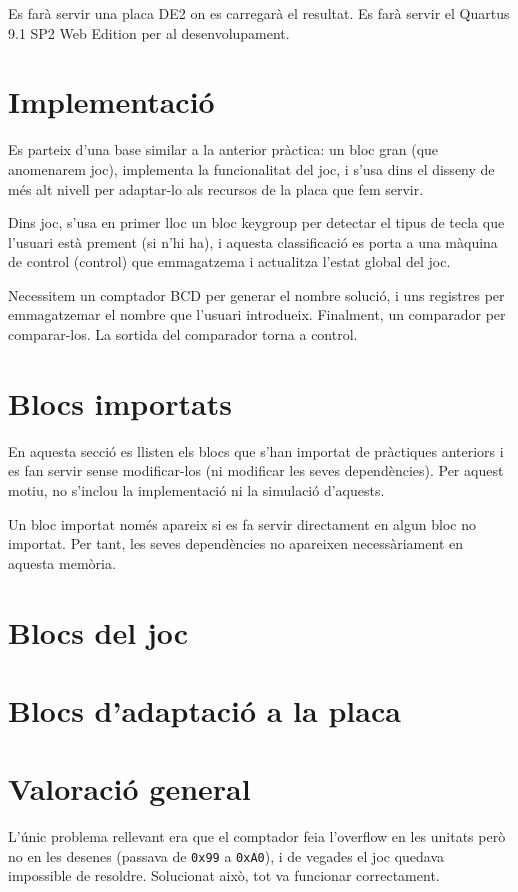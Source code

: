 Es farà servir una placa DE2 on es carregarà el resultat. Es farà servir el Quartus 9.1 SP2 Web Edition per al desenvolupament.

\section{Implementació}

Es parteix d'una base similar a la anterior pràctica: un bloc gran (que anomenarem \textsf{joc}), implementa la funcionalitat del joc, i s'usa dins el disseny
de més alt nivell per adaptar-lo als recursos de la placa que fem servir.

Dins \textsf{joc}, s'usa en primer lloc un bloc \textsf{keygroup} per detectar el tipus de tecla que l'usuari està prement (si n'hi ha), i
aquesta classificació es porta a una màquina de control (\textsf{control}) que emmagatzema i actualitza l'estat global del joc.

Necessitem un comptador BCD per generar el nombre solució, i uns registres per emmagatzemar el nombre que l'usuari introdueix.
Finalment, un comparador per comparar-los. La sortida del comparador torna a \textsf{control}.

\section{Blocs importats}

En aquesta secció es llisten els blocs que s'han importat de pràctiques
anteriors i es fan servir sense modificar-los (ni modificar les seves
dependències). Per aquest motiu, no s'inclou la implementació ni la
simulació d'aquests.

Un bloc importat només apareix si es fa servir directament en algun bloc
no importat. Per tant, les seves dependències no apareixen necessàriament
en aquesta memòria.


\section{Blocs del joc}

\section{Blocs d'adaptació a la placa}

\section{Valoració general}

L'únic problema rellevant era que el comptador feia l'overflow en les unitats
però no en les desenes (passava de \texttt{0x99} a \texttt{0xA0}), i de vegades
el joc quedava impossible de resoldre. Solucionat això, tot va funcionar correctament.
